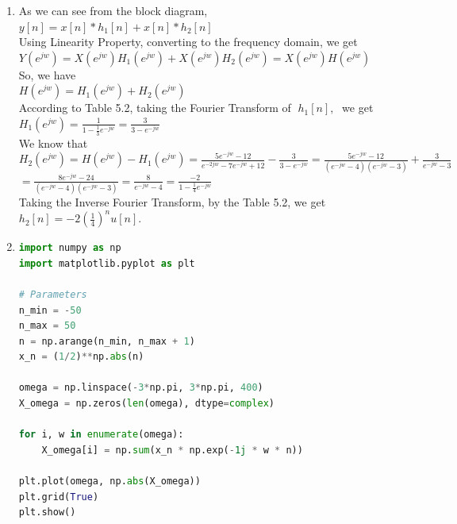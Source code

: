 \documentclass[10pt,a4paper, margin=1in]{article}
\begin{document}
\begin{enumerate}
\item %
As we can see from the block diagram,\vspace{0.3cm}\\
$y[n] = x[n] \ast h_1[n] + x[n] \ast h_2[n]$\vspace{0.3cm}\\
Using Linearity Property, converting to the frequency domain, we get\vspace{0.3cm}\\
$Y(e^{jw}) = X(e^{jw})H_1(e^{jw}) + X(e^{jw})H_2(e^{jw}) = X(e^{jw})H(e^{jw})$\vspace{0.3cm}\\
So, we have\vspace{0.3cm}\\
$H(e^{jw}) = H_1(e^{jw}) + H_2(e^{jw})$\vspace{0.3cm}\\
According to Table 5.2, taking the Fourier Transform of $\; h_1[n], \;$ we get\vspace{0.3cm}\\
$H_1(e^{jw}) = \frac{1}{1-\frac{1}{3}e^{-jw}} = \frac{3}{3-e^{-jw}}$\vspace{0.3cm}\\
We know that\vspace{0.3cm}\\
$H_2(e^{jw}) = H(e^{jw}) - H_1(e^{jw}) = \frac{5e^{-jw}-12}{e^{-2jw}-7e^{-jw}+12} - \frac{3}{3-e^{-jw}} = \frac{5e^{-jw}-12}{(e^{-jw}-4)(e^{-jw}-3)} + \frac{3}{e^{-jw}-3}$\vspace{0.3cm}\\
$= \frac{8e^{-jw}-24}{(e^{-jw}-4)(e^{-jw}-3)} = \frac{8}{e^{-jw}-4} = \frac{-2}{1-\frac{1}{4}e^{-jw}}$\vspace{0.3cm}\\
Taking the Inverse Fourier Transform, by the Table 5.2, we get\vspace{0.3cm}\\
$h_2[n] = -2(\frac{1}{4})^nu[n].$\vspace{0.3cm}\\
    
\item %
\begin{lstlisting}[language=Python, caption=DTFT]
import numpy as np
import matplotlib.pyplot as plt

# Parameters
n_min = -50
n_max = 50
n = np.arange(n_min, n_max + 1)
x_n = (1/2)**np.abs(n)

omega = np.linspace(-3*np.pi, 3*np.pi, 400)
X_omega = np.zeros(len(omega), dtype=complex)

for i, w in enumerate(omega):
    X_omega[i] = np.sum(x_n * np.exp(-1j * w * n))

plt.plot(omega, np.abs(X_omega))
plt.grid(True)
plt.show()
\end{lstlisting}


\end{enumerate}
\end{document}
